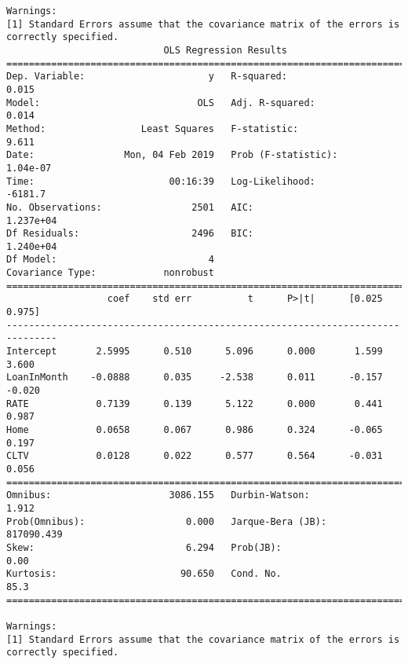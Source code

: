 \documentclass[11pt]{article}
\begin{document}
\begin{Verbatim}[commandchars=\\\{\}]
Warnings:
[1] Standard Errors assume that the covariance matrix of the errors is correctly specified.
                            OLS Regression Results                            
==============================================================================
Dep. Variable:                      y   R-squared:                       0.015
Model:                            OLS   Adj. R-squared:                  0.014
Method:                 Least Squares   F-statistic:                     9.611
Date:                Mon, 04 Feb 2019   Prob (F-statistic):           1.04e-07
Time:                        00:16:39   Log-Likelihood:                -6181.7
No. Observations:                2501   AIC:                         1.237e+04
Df Residuals:                    2496   BIC:                         1.240e+04
Df Model:                           4                                         
Covariance Type:            nonrobust                                         
===============================================================================
                  coef    std err          t      P>|t|      [0.025      0.975]
-------------------------------------------------------------------------------
Intercept       2.5995      0.510      5.096      0.000       1.599       3.600
LoanInMonth    -0.0888      0.035     -2.538      0.011      -0.157      -0.020
RATE            0.7139      0.139      5.122      0.000       0.441       0.987
Home            0.0658      0.067      0.986      0.324      -0.065       0.197
CLTV            0.0128      0.022      0.577      0.564      -0.031       0.056
==============================================================================
Omnibus:                     3086.155   Durbin-Watson:                   1.912
Prob(Omnibus):                  0.000   Jarque-Bera (JB):           817090.439
Skew:                           6.294   Prob(JB):                         0.00
Kurtosis:                      90.650   Cond. No.                         85.3
==============================================================================

Warnings:
[1] Standard Errors assume that the covariance matrix of the errors is correctly specified.

    \end{Verbatim}

    \begin{center}
    \end{center}
    { \hspace*{\fill} \\}
    
\end{document}
